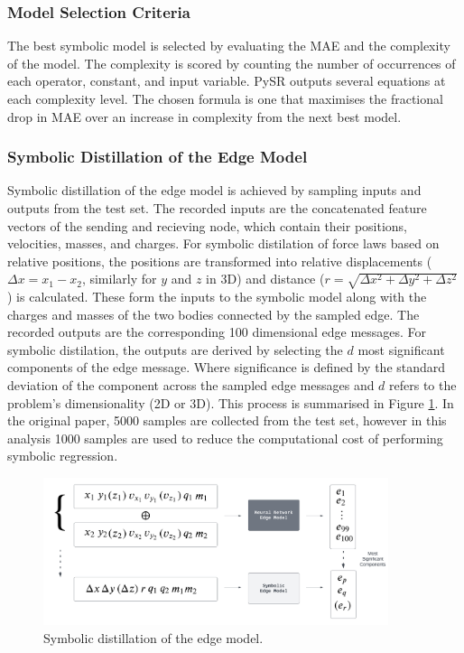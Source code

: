 \documentclass[11pt]{article}
\begin{document}
\subsubsection{Model Selection Criteria}
The best symbolic model is selected by evaluating the MAE and the complexity of the model. The complexity is scored by counting the number of occurrences of each operator, constant, and input variable. PySR outputs several equations at each complexity level. The chosen formula is one that maximises the fractional drop in MAE over an increase in complexity from the next best model.

\subsubsection{Symbolic Distillation of the Edge Model}
Symbolic distillation of the edge model is achieved by sampling inputs and outputs from the test set. The recorded inputs are the concatenated feature vectors of the sending and recieving node, which contain their positions, velocities, masses, and charges. For symbolic distilation of force laws based on relative positions, the positions are transformed into relative displacements ($\Delta x = x_1 - x_2$, similarly for $y$ and $z$ in 3D) and distance ($r = \sqrt{\Delta x^2 + \Delta y^2 + \Delta z^2}$) is calculated. These form the inputs to the symbolic model along with the charges and masses of the two bodies connected by the sampled edge. The recorded outputs are the corresponding 100 dimensional edge messages. For symbolic distilation, the outputs are derived by selecting the $d$ most significant components of the edge message. Where significance is defined by the standard deviation of the component across the sampled edge messages and $d$ refers to the problem's dimensionality (2D or 3D). This process is summarised in Figure \ref{fig:edge_model_symbolic_distillation}. In the original paper, 5000 samples are collected from the test set, however in this analysis 1000 samples are used to reduce the computational cost of performing symbolic regression.

\begin{figure}[H]
    \centering
    \includegraphics[width=0.9\textwidth]{figs/edge_distillation.png}
    \caption{Symbolic distillation of the edge model.}
    \label{fig:edge_model_symbolic_distillation}
\end{figure}
\end{document}
